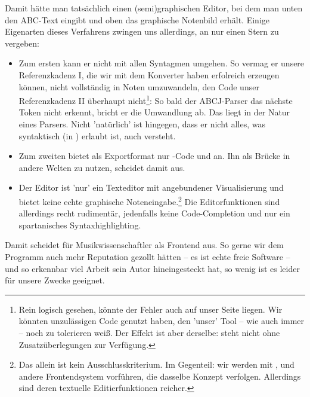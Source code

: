 Damit hätte man tatsächlich einen (semi)graphischen Editor, bei dem man unten
den ABC-Text eingibt und oben das graphische Notenbild erhält. Einige Eigenarten
dieses Verfahrens zwingen uns allerdings, an  nur einen Stern zu
vergeben:

\begin{itemize}
  \item Zum ersten kann er nicht mit allen Syntagmen umgehen. So vermag er
  unsere Referenzkadenz I, die wir mit dem Konverter  haben
  erfolreich erzeugen können, nicht vollständig in Noten umzuwandeln, den Code
  unser Referenzkadenz II überhaupt nicht\footnote{Rein logisch gesehen, könnte
  der Fehler auch auf unser Seite liegen. Wir könnten unzulässigen Code genutzt
  haben, den 'unser' Tool  -- wie auch immer -- noch zu tolerieren
  weiß. Der Effekt ist aber derselbe:  steht nicht ohne
  Zusatzüberlegungen zur Verfügung.}: So bald der ABCJ-Parser das nächste Token
  nicht erkennt, bricht er die Umwandlung ab. Das liegt in der Natur eines
  Parsers. Nicht 'natürlich' ist hingegen, dass er nicht alles, was syntaktisch
  (in ) erlaubt ist, auch versteht.
  \item Zum zweiten bietet  als Exportformat nur -Code und
   an. Ihn als Brücke in andere Welten zu nutzen, scheidet damit aus.
  \item Der Editor ist 'nur' ein Texteditor mit angebundener Visualisierung und
  bietet keine echte graphische Noteneingabe.\footnote{Das allein ist kein
  Ausschlusskriterium. Im Gegenteil: wir werden mit ,
   und  andere Frontendsystem vorführen, die dasselbe
  Konzept verfolgen. Allerdings sind deren textuelle Editierfunktionen
  reicher.} Die Editorfunktionen sind allerdings recht rudimentär, jedenfalls
  keine Code-Completion und nur ein spartanisches Syntaxhighlighting.
\end{itemize}

Damit scheidet  für Musikwissenschaftler als Frontend aus. So gerne
wir dem Programm auch mehr Reputation gezollt hätten -- es ist echte freie
Software -- und so erkennbar viel Arbeit sein Autor hineingesteckt hat, so wenig
ist es leider für unsere Zwecke geeignet.


%

